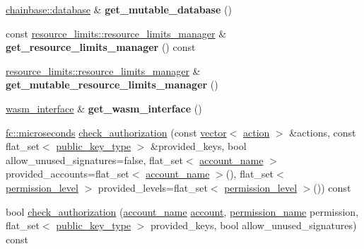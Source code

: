 \begin{DoxyCompactItemize}
\mbox{\hyperlink{classchainbase_1_1database}{chainbase\+::database}} \& {\bfseries get\+\_\+mutable\+\_\+database} ()
\item 
\mbox{\label{classaacio_1_1chain_1_1chain__controller_a9aadae7becf5682d50dfe78215913f72}} 
const \mbox{\hyperlink{classaacio_1_1chain_1_1resource__limits_1_1resource__limits__manager}{resource\+\_\+limits\+::resource\+\_\+limits\+\_\+manager}} \& {\bfseries get\+\_\+resource\+\_\+limits\+\_\+manager} () const
\item 
\mbox{\label{classaacio_1_1chain_1_1chain__controller_a2d29bd51ed791753b52ff0067034619e}} 
\mbox{\hyperlink{classaacio_1_1chain_1_1resource__limits_1_1resource__limits__manager}{resource\+\_\+limits\+::resource\+\_\+limits\+\_\+manager}} \& {\bfseries get\+\_\+mutable\+\_\+resource\+\_\+limits\+\_\+manager} ()
\item 
\mbox{\label{classaacio_1_1chain_1_1chain__controller_a2b4a8671310f4ca323800e5b90b4dc23}} 
\mbox{\hyperlink{classaacio_1_1chain_1_1wasm__interface}{wasm\+\_\+interface}} \& {\bfseries get\+\_\+wasm\+\_\+interface} ()
\item 
\mbox{\hyperlink{classfc_1_1microseconds}{fc\+::microseconds}} \mbox{\hyperlink{classaacio_1_1chain_1_1chain__controller_a207cee9826f5abac00f1de3c5735df3d}{check\+\_\+authorization}} (const \mbox{\hyperlink{classstd_1_1vector}{vector}}$<$ \mbox{\hyperlink{structaacio_1_1chain_1_1action}{action}} $>$ \&actions, const flat\+\_\+set$<$ \mbox{\hyperlink{classfc_1_1crypto_1_1public__key}{public\+\_\+key\+\_\+type}} $>$ \&provided\+\_\+keys, bool allow\+\_\+unused\+\_\+signatures=false, flat\+\_\+set$<$ \mbox{\hyperlink{structaacio_1_1chain_1_1name}{account\+\_\+name}} $>$ provided\+\_\+accounts=flat\+\_\+set$<$ \mbox{\hyperlink{structaacio_1_1chain_1_1name}{account\+\_\+name}} $>$(), flat\+\_\+set$<$ \mbox{\hyperlink{structaacio_1_1chain_1_1permission__level}{permission\+\_\+level}} $>$ provided\+\_\+levels=flat\+\_\+set$<$ \mbox{\hyperlink{structaacio_1_1chain_1_1permission__level}{permission\+\_\+level}} $>$()) const
\item 
bool \mbox{\hyperlink{classaacio_1_1chain_1_1chain__controller_a43d6bdf9938687a495c7e31762a37467}{check\+\_\+authorization}} (\mbox{\hyperlink{structaacio_1_1chain_1_1name}{account\+\_\+name}} \mbox{\hyperlink{structaccount}{account}}, \mbox{\hyperlink{structaacio_1_1chain_1_1name}{permission\+\_\+name}} permission, flat\+\_\+set$<$ \mbox{\hyperlink{classfc_1_1crypto_1_1public__key}{public\+\_\+key\+\_\+type}} $>$ provided\+\_\+keys, bool allow\+\_\+unused\+\_\+signatures) const
\end{DoxyCompactItemize}
